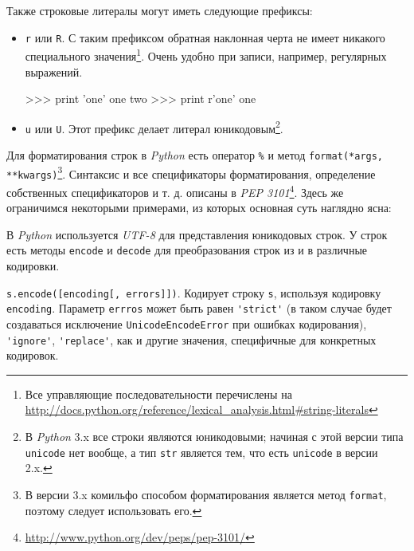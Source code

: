 Также строковые литералы могут иметь следующие префиксы:
\begin{itemize}
  \item \lstinline{r} или \lstinline{R}. С таким префиксом обратная наклонная черта не имеет никакого специального значения\footnote{Все управляющие последовательности перечислены на \url{http://docs.python.org/reference/lexical_analysis.html\#string-literals}}. Очень удобно при записи, например, регулярных выражений.
\begin{pylst}{}{}
>>> print 'one\ntwo'
one two
>>> print r'one\ntwo'
one\ntwo
\end{pylst}
  \item \lstinline{u} или \lstinline{U}. Этот префикс делает литерал юникодовым\footnote{В \emph{Python} 3.x все строки являются юникодовыми; начиная с этой версии типа \lstinline{unicode} нет вообще, а тип \lstinline{str} является тем, что есть \lstinline{unicode} в версии 2.x.}.
\end{itemize}

Для форматирования строк в \emph{Python} есть оператор \lstinline{%} и метод \lstinline{format(*args, **kwargs)}\footnote{В версии 3.x комильфо способом форматирования является метод \lstinline{format}, поэтому следует использовать его.}. Синтаксис и все спецификаторы форматирования, определение собственных спецификаторов и т. д. описаны в \emph{PEP 3101}\footnote{\url{http://www.python.org/dev/peps/pep-3101/}}. Здесь же ограничимся некоторыми примерами, из которых основная суть наглядно ясна:


В \emph{Python} используется \emph{UTF-8} для представления юникодовых строк. У строк есть методы \lstinline{encode} и \lstinline{decode} для преобразования строк из и в различные кодировки.

\lstinline{s.encode([encoding[, errors]])}. Кодирует строку \lstinline{s}, используя кодировку \lstinline{encoding}. Параметр \lstinline{errros} может быть равен \lstinline{'strict'} (в таком случае будет создаваться исключение \lstinline{UnicodeEncodeError} при ошибках кодирования), \lstinline{'ignore'}, \lstinline{'replace'}, как и другие значения, специфичные для конкретных кодировок.

